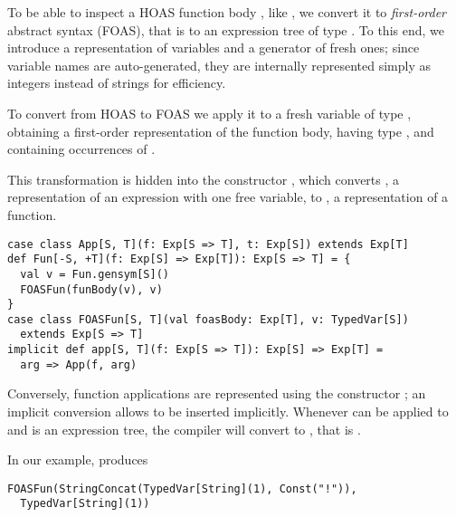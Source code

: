 To be able to inspect a HOAS function body \codebreakSpace{}, like , we convert it to \emph{first-order} abstract syntax (FOAS), that is to an expression tree of type .
To this end, we introduce a representation of variables and a generator of fresh ones; since variable names are auto-generated, they are internally represented simply as integers instead of strings for efficiency.

To convert  from HOAS to FOAS we apply it to a fresh variable  of type , obtaining a first-order representation of the function body, having type , and containing occurrences of .

This transformation is hidden into the constructor , which converts , a representation of an expression with one free variable, to , a representation of a function.

\begin{lstlisting}
case class App[S, T](f: Exp[S => T], t: Exp[S]) extends Exp[T]
def Fun[-S, +T](f: Exp[S] => Exp[T]): Exp[S => T] = {
  val v = Fun.gensym[S]()
  FOASFun(funBody(v), v)
}
case class FOASFun[S, T](val foasBody: Exp[T], v: TypedVar[S])
  extends Exp[S => T]
implicit def app[S, T](f: Exp[S => T]): Exp[S] => Exp[T] =
  arg => App(f, arg)
\end{lstlisting}

Conversely, function applications are represented using the constructor ; an implicit conversion allows  to be inserted implicitly. Whenever  can be applied to  and  is an expression tree, the compiler will convert  to , that is .


In our example,  produces
\begin{lstlisting}
FOASFun(StringConcat(TypedVar[String](1), Const("!")),
  TypedVar[String](1))
\end{lstlisting}

